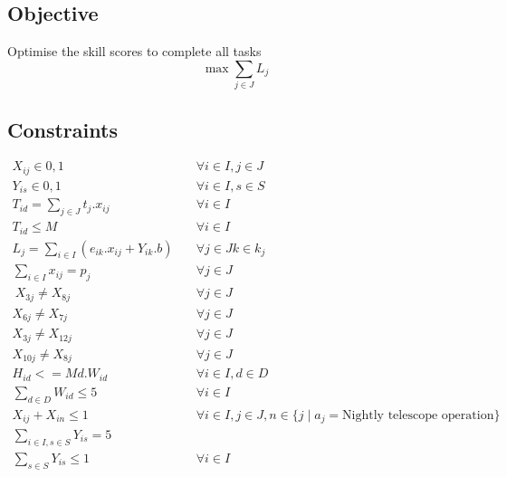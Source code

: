\documentclass{article}
\begin{document}
	\subsection*{Objective}
	Optimise the skill scores to complete all tasks
	\begin{equation*}
		\max \sum_{j\in J} L_j
	\end{equation*}
	
	\subsection*{Constraints}
	
	\begin{align}
		X_{ij} \in {0,1} & \quad \forall i\in I, j\in J \label{C1}\\
		Y_{is} \in {0,1} & \quad \forall i\in I, s\in S \label{C15}\\
		T_{id} = \sum_{j\in J} t_j . x_{ij} & \quad \forall i\in I \label{C2}\\
		T_{id} \leq M & \quad \forall i\in I \label{C3}\\
		L_j = \sum_{i\in I} (e_{ik} . x_{ij} + Y_{ik} . b) & \quad \forall j\in J k\in k_j \label{C4}\\
		\sum_{i\in I} x_{ij} = p_j & \quad \forall j\in J \label{C5}\\\
		X_{3j} \neq X_{8j} & \quad \forall j\in J \label{C6}\\
		X_{6j} \neq X_{7j} & \quad \forall j\in J \label{C7}\\
		X_{3j} \neq X_{12j} & \quad \forall j\in J \label{C8}\\
		X_{10j} \neq X_{8j} & \quad \forall j\in J \label{C9}\\
		H_{id} <= Md . W_{id} & \quad \forall i\in I, d\in D \label{C10}\\
		\sum_{d\in D} W_{id} \leq 5 & \quad \forall i\in I \label{C11}\\
		X_{ij} + X_{in} \leq 1 & \quad \forall i\in I, j\in J, n\in \{j \mid a_j = \text{Nightly telescope operation}\} \label{C12}\\
		\sum_{i\in I, s\in S} Y_{is} = 5 & \label{C13}\\
		\sum_{s\in S} Y_{is} \leq 1 & \quad \forall i\in I \label{C14}
	\end{align}
\end{document}
